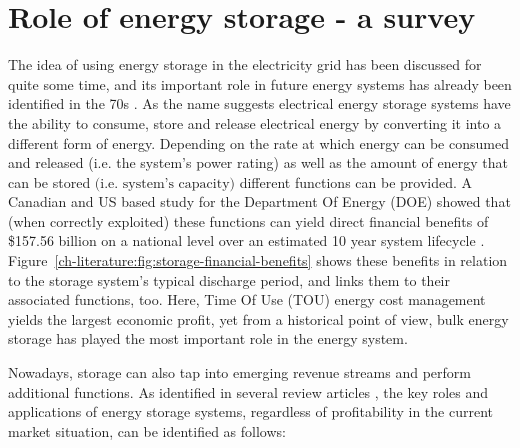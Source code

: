 \section{Role of energy storage - a survey}
\label{ch-literature:sec:role-of-energy-storage-a-survey}



The idea of using energy storage in the electricity grid has been discussed for quite some time, and its important role in future energy systems has already been identified in the 70s \cite{Kalhammer1979}.
As the name suggests electrical energy storage systems have the ability to consume, store and release electrical energy by converting it into a different form of energy.
Depending on the rate at which energy can be consumed and released (i.e. the system's power rating) as well as the amount of energy that can be stored $\text{(i.e. system's capacity)}$ different functions can be provided.
A Canadian and US based study for the Department Of Energy (DOE) showed that (when correctly exploited) these functions can yield direct financial benefits of \$157.56 billion on a national level over an estimated 10 year system lifecycle \cite{Eyer2010a}.
Figure~\ref{ch-literature:fig:storage-financial-benefits} shows these benefits in relation to the storage system's typical discharge period, and links them to their associated functions, too.
Here, Time Of Use (TOU) energy cost management yields the largest economic profit, yet from a historical point of view, bulk energy storage has played the most important role in the energy system.

Nowadays, storage can also tap into emerging revenue streams and perform additional functions.
As identified in several review articles \cite{Chen2009, Katsanevakis2017, Guney2017}, the key roles and applications of energy storage systems, regardless of profitability in the current market situation, can be identified as follows:

